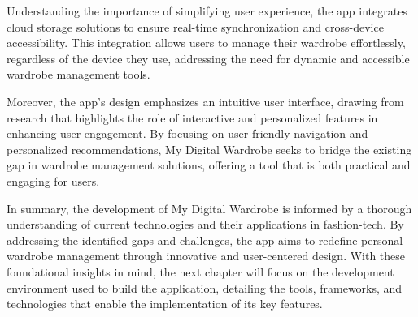 Understanding the importance of simplifying user experience, the app integrates cloud storage solutions to ensure real-time synchronization and cross-device accessibility. This integration allows users to manage their wardrobe effortlessly, regardless of the device they use, addressing the need for dynamic and accessible wardrobe management tools.

Moreover, the app's design emphasizes an intuitive user interface, drawing from research that highlights the role of interactive and personalized features in enhancing user engagement. By focusing on user-friendly navigation and personalized recommendations, My Digital Wardrobe seeks to bridge the existing gap in wardrobe management solutions, offering a tool that is both practical and engaging for users.

In summary, the development of My Digital Wardrobe is informed by a thorough understanding of current technologies and their applications in fashion-tech. By addressing the identified gaps and challenges, the app aims to redefine personal wardrobe management through innovative and user-centered design. With these foundational insights in mind, the next chapter will focus on the development environment used to build the application, detailing the tools, frameworks, and technologies that enable the implementation of its key features.
